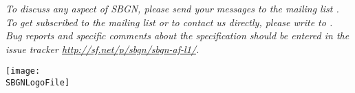 \begin{titlepage}
\begin{center}
\vspace*{1em}

\vfill

\normalsize
\begin{minipage}{5in}
  \emph{To discuss any aspect of SBGN, please send your messages to the mailing list .  To get subscribed to the mailing list or to contact us directly, please write to . Bug reports and specific comments about the specification should be entered in the issue tracker \url{http://sf.net/p/sbgn/sbgn-af-l1/}.  }
\end{minipage}

\vfill

\centerline{\texttt{[image: \\SBGNLogoFile]}}

\end{center}

\end{titlepage}

%
%

\setcounter{page}{2}